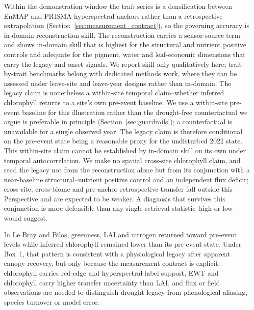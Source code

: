 \documentclass[pdflatex,sn-mathphys-num]{sn-jnl}
\begin{document}
Within the demonstration window the trait series is a densification between EnMAP and PRISMA hyperspectral anchors rather than a retrospective extrapolation (Section~\ref{sec:measurement_contract}), so the governing accuracy is in-domain reconstruction skill. The reconstruction carries a sensor-source term and shows in-domain skill that is highest for the structural and nutrient positive controls and adequate for the pigment, water and leaf-economic dimensions that carry the legacy and onset signals. We report skill only qualitatively here; trait-by-trait benchmarks belong with dedicated methods work, where they can be assessed under leave-site and leave-year designs rather than in-domain. The legacy claim is nonetheless a within-site temporal claim--whether inferred chlorophyll returns to a site's own pre-event baseline. We use a within-site pre-event baseline for this illustration rather than the drought-free counterfactual we argue is preferable in principle (Section~\ref{sec:guardrails}); a counterfactual is unavailable for a single observed year. The legacy claim is therefore conditional on the pre-event state being a reasonable proxy for the undisturbed 2022 state. This within-site claim cannot be established by in-domain skill on its own under temporal autocorrelation. We make no spatial cross-site chlorophyll claim, and read the legacy not from the reconstruction alone but from its conjunction with a near-baseline structural--nutrient positive control and an independent flux deficit; cross-site, cross-biome and pre-anchor retrospective transfer fall outside this Perspective and are expected to be weaker. A diagnosis that survives this conjunction is more defensible than any single retrieval statistic--high or low--would suggest.

In Le Bray and Bilos, greenness, LAI and nitrogen returned toward pre-event levels while inferred chlorophyll remained lower than its pre-event state. Under Box~1, that pattern is consistent with a physiological legacy after apparent canopy recovery, but only because the measurement contract is explicit: chlorophyll carries red-edge and hyperspectral-label support, EWT and chlorophyll carry higher transfer uncertainty than LAI, and flux or field observations are needed to distinguish drought legacy from phenological aliasing, species turnover or model error.
\end{document}
